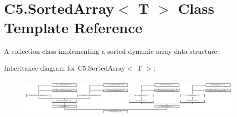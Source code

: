 \hypertarget{class_c5_1_1_sorted_array}{}\section{C5.\+Sorted\+Array$<$ T $>$ Class Template Reference}
\label{class_c5_1_1_sorted_array}


A collection class implementing a sorted dynamic array data structure.  


Inheritance diagram for C5.\+Sorted\+Array$<$ T $>$\+:\begin{figure}[H]
\begin{center}
\leavevmode
\includegraphics[height=1.971831cm]{class_c5_1_1_sorted_array}
\end{center}
\end{figure}
